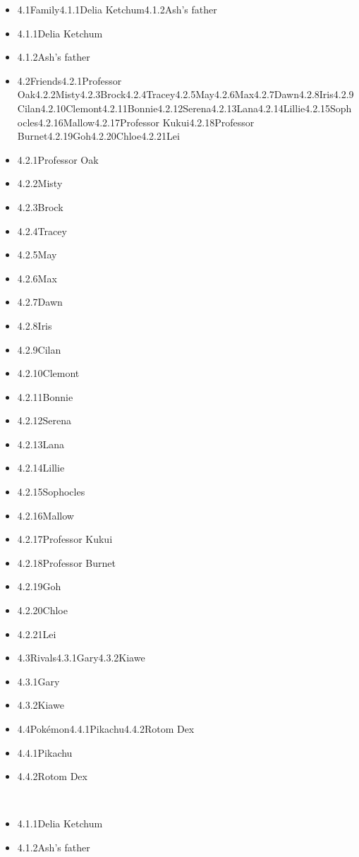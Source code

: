 \documentclass[a4paper,12pt]{article}
\begin{document}
\begin{itemize}
\item 4.1Family4.1.1Delia Ketchum4.1.2Ash's father
\item 4.1.1Delia Ketchum
\item 4.1.2Ash's father
\item 4.2Friends4.2.1Professor Oak4.2.2Misty4.2.3Brock4.2.4Tracey4.2.5May4.2.6Max4.2.7Dawn4.2.8Iris4.2.9Cilan4.2.10Clemont4.2.11Bonnie4.2.12Serena4.2.13Lana4.2.14Lillie4.2.15Sophocles4.2.16Mallow4.2.17Professor Kukui4.2.18Professor Burnet4.2.19Goh4.2.20Chloe4.2.21Lei
\item 4.2.1Professor Oak
\item 4.2.2Misty
\item 4.2.3Brock
\item 4.2.4Tracey
\item 4.2.5May
\item 4.2.6Max
\item 4.2.7Dawn
\item 4.2.8Iris
\item 4.2.9Cilan
\item 4.2.10Clemont
\item 4.2.11Bonnie
\item 4.2.12Serena
\item 4.2.13Lana
\item 4.2.14Lillie
\item 4.2.15Sophocles
\item 4.2.16Mallow
\item 4.2.17Professor Kukui
\item 4.2.18Professor Burnet
\item 4.2.19Goh
\item 4.2.20Chloe
\item 4.2.21Lei
\item 4.3Rivals4.3.1Gary4.3.2Kiawe
\item 4.3.1Gary
\item 4.3.2Kiawe
\item 4.4Pokémon4.4.1Pikachu4.4.2Rotom Dex
\item 4.4.1Pikachu
\item 4.4.2Rotom Dex
\end{itemize}\\ \par \vspace{0.5cm}

\begin{itemize}
\item 4.1.1Delia Ketchum
\item 4.1.2Ash's father
\end{itemize}\\ \par \vspace{0.5cm}
\end{document}
